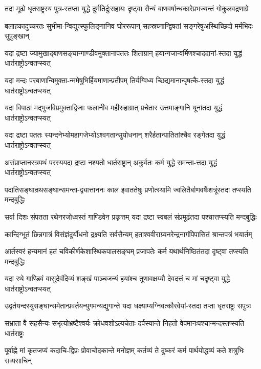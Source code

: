 \twolineshloka
{तदा मूढो धृतराष्ट्रस्य पुत्र-स्तप्ता युद्धे दुर्मतिर्दुःसहायः}
{दृष्ट्वा सैन्यं बाणवर्षान्धकारेप्रभज्यन्तं गोकुलवद्रणाग्रे}


\twolineshloka
{बलाहकादुच्चरतः सुभीमा-न्विद्युत्स्फुलिङ्गानिव घोररूपान्}
{सहस्रघ्नान्द्विषतां सङ्गरेषुअस्थिच्छिदो मर्मभिदः सुपुङ्खान्}


\twolineshloka
{यदा द्रष्टा ज्यामुखाद्बाणसङ्घान्गाण्डीवमुक्तानापततः शिताग्रान्}
{हयान्गजान्वर्मिणश्चाददानां-स्तदा युद्धं धार्तराष्ट्रोऽन्वतप्स्यत्}


\twolineshloka
{यदा मन्दः परबाणान्विमुक्ता-न्ममेषुभिर्हियमाणान्प्रतीपम्}
{तिर्यग्विध्य च्छिद्यमानान्पृषत्कै-स्तदा युद्धं धार्तराष्ट्रोऽन्वतप्स्यत्}


\twolineshloka
{यदा विपाठा मद्भुजविप्रमुक्ताद्विजाः फलानीव महीरुहाग्रात्}
{प्रचेतार उत्तमाङ्गानि यूनांतदा युद्धं धार्तराष्ट्रोऽन्वतप्स्यत्}


\twolineshloka
{यदा द्रष्टा पततः स्यन्दनेभ्योमहागजेभ्योऽश्वगतान्सुयोधनान्}
{शरैर्हतान्पातितांश्चैव रङ्गेतदा युद्धं धार्तराष्ट्रोऽन्वतप्स्यत्}


\twolineshloka
{असंप्राप्तानस्त्रपथं परस्ययदा द्रष्टा नश्यतो धार्तराष्ट्रान्}
{अकुर्वतः कर्म युद्धे समन्ता-त्तदा युद्धं धार्तराष्ट्रोऽन्वतप्स्यत्}


\twolineshloka
{पदातिसङ्घान्रथसङ्घान्समन्ता-द्व्यात्ताननः काल इवाततेषुः}
{प्रणोत्स्यामि ज्वलितैर्बाणवर्षैःशत्रूंस्तदा तप्स्यति मन्दबुद्धिः}


\twolineshloka
{सर्वा दिशः संपतता रथेनरजोध्वस्तं गाण्डिवेन प्रकृत्तम्}
{यदा द्रष्टा स्वबलं संप्रमूढंतदा पश्चात्तप्स्यति मन्दबुद्धिः}


\twolineshloka
{कान्दिग्भूतं छिन्नगात्रं विसंज्ञंदुर्योधनो द्रक्ष्यति सर्वसैन्यम्}
{हताश्ववीराग्र्यनरेन्द्रनागंपिपासितं श्रान्तपत्रं भयार्तम्}


\twolineshloka
{आर्तस्वरं हन्यमानं हतं चविकीर्णकेशास्थिकपालसङ्घम्}
{प्रजापतेः कर्म यथार्थनिष्ठितंतदा दृष्ट्वा तप्स्यति मन्दबुद्धिः}


\twolineshloka
{यदा रथे गाण्डिवं वासुदेवंदिव्यं शङ्खं पाञ्चजन्यं हयांश्च}
{तूणावक्षय्यौ देवदत्तं च मां चदृष्ट्वा युद्धे धार्तराष्ट्रोऽन्वतप्स्यत्}


\twolineshloka
{उद्वर्तयन्दस्युसङ्घान्समेतान्प्रवर्तयन्युगमन्यद्युगान्ते}
{यदा धक्ष्याम्यग्निवत्कौरवेयां-स्तदा तप्ता धृतराष्ट्रः सपुत्रः}


\twolineshloka
{सभ्राता वै सहसैन्यः सभृत्योभ्रष्टैश्वर्यः क्रोधवशोऽल्पचेताः}
{दर्पस्यान्ते निहतो वेपमानःपश्चान्मन्दस्तप्स्यति धार्तराष्ट्रः}


\twolineshloka
{पूर्वाह्णे मां कृतजप्यं कदाचि-द्विप्रः प्रोवाचोदकान्ते मनोज्ञम्}
{कर्तव्यं ते दुष्करं कर्म पार्थयोद्धव्यं कते शत्रुभिः सव्यसाचिन्}


